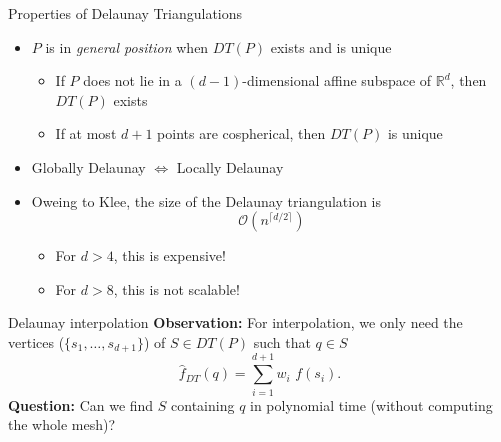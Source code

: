 \documentclass[xcolor=dvipsnames]{beamer}
\begin{document}
\begin{frame}{Properties of Delaunay Triangulations}
\begin{itemize}
\item $P$ is in {\it general position} when $DT(P)$ exists and is unique
\begin{itemize}
\item If $P$ does not lie in a $(d-1)$-dimensional affine
subspace of $\mathbb{R}^d$, then $DT(P)$ exists
\item If at most $d+1$ points are cospherical, then $DT(P)$ is unique
\end{itemize}
\item Globally Delaunay $\iff$ Locally Delaunay
\item Oweing to Klee, the size of the Delaunay triangulation is
$$
\mathcal{O}\left(n^{\lceil d/2 \rceil}\right)
$$
\pause
\begin{itemize}
\item For $d > 4$, this is expensive!
\item For $d > 8$, this is not scalable!
\end{itemize}
\end{itemize}
\end{frame}
\begin{frame}{Delaunay interpolation}
\textbf{Observation:}
For interpolation, we only need the
vertices ($\{s_1, \ldots, s_{d+1}\}$) of $S \in DT(P)$ such that $q\in S$
$$
{\hat f}_{DT}(q) = \sum_{i=1}^{d+1} w_i\text{~}f(s_i).
$$
\medskip
\textbf{Question:}
Can we find $S$ containing $q$ in polynomial time (without computing the whole mesh)?
\end{frame}
\end{document}

